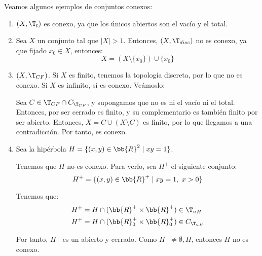 \begin{ejemplo}
    Veamos algunos ejemplos de conjuntos conexos:
    \begin{enumerate}
        \item $(X,\T_t)$ es conexo, ya que los únicos abiertos son el vacío y el total.

        \item Sea $X$ un conjunto tal que $|X|>1$. Entonces, $(X,\T_{disc})$ no es conexo, ya que fijado $x_0\in X$, entonces:
        \begin{equation*}
            X = (X\setminus \{x_0\})\cup \{x_0\}
        \end{equation*}

        \item $(X,\T_{CF})$. Si $X$ es finito, tenemos la topología discreta, por lo que no es conexo. Si $X$ es infinito, sí es conexo. Veámoslo:

        Sea $C\in \T_{CF}\cap C_{\T_{CF}}$, y supongamos que no es ni el vacío ni el total. Entonces, por ser cerrado es finito, y su complementario es también finito por ser abierto. Entonces, $X=C\cup (X\setminus C)$ es finito, por lo que llegamos a una contradicción. Por tanto, es conexo.

        \item Sea la hipérbola $H=\{(x,y)\in \bb{R}^2\mid xy=1\}$.

        Tenemos que $H$ no es conexo. Para verlo, sea $H^+$ el siguiente conjunto:
        \begin{equation*}
            H^+ = \{(x,y)\in \bb{R}^+\mid xy=1,~ x>0\}
        \end{equation*}

        Tenemos que:
        \begin{align*}
            H^+ &= H\cap (\bb{R}^+\times \bb{R}^+)\in {\T_u}_H\\
            H^+ &= H\cap (\bb{R}^+_0\times \bb{R}^+_0)\in C_{{\T_u}_H}
        \end{align*}

        Por tanto, $H^+$ es un abierto y cerrado. Como $H^+\neq \emptyset, H$, entonces $H$ no es conexo.
    \end{enumerate}
\end{ejemplo}

